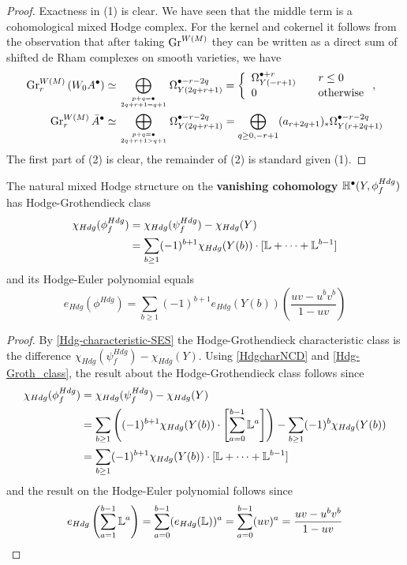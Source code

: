 \documentclass[../main.tex]{subfiles}
\begin{document}
\begin{proof} Exactness in (1) is clear. We have seen that the middle term is a cohomological mixed Hodge complex. For the kernel and cokernel it follows from the observation that after taking $\operatorname{Gr}^{W(M)}$ they can be written as a direct sum of shifted de Rham complexes on smooth varieties, we have
\begin{align*}
\operatorname{Gr}_r^{W(M)} \left(W_0 A^\bullet \right) &\simeq  \bigoplus_{{p+q=\bullet}\atop{2q+r+1=q+1}}  \Omega^{\bullet-r-2q}_{Y({2q+r+1})} = \left\{ \begin{array}{ll}
     \Omega^{\bullet+r}_{Y({-r+1})} &\quad r \leq 0 \\
     0 &\quad \text{otherwise} \\
\end{array} \right. , \\ \operatorname{Gr}_r^{W(M)} \bar A^\bullet &\simeq \bigoplus_{{p+q=\bullet}\atop{2q+r+1>q+1}}  \Omega^{\bullet-r-2q}_{Y({2q+r+1})} =  \bigoplus_{q \geq0,-r+1}(a_{r+2q+1})_* \Omega^{\bullet-r-2q}_{Y(r+2q+1)}
\end{align*}
The first part of (2) is clear, the remainder of (2) is standard given (1).
\end{proof}

\begin{cor}
The natural mixed Hodge structure on the \textbf{vanishing cohomology} $\mathbb{H}^\bullet(Y,\phi_f^{Hdg})$ has Hodge-Grothendieck class
\begin{align*} 
    \chi_{Hdg}(\phi_f^{Hdg} ) &= \chi_{Hdg}(\psi_f^{Hdg})-\chi_{Hdg}(Y) \\
    &= \sum_{b \geq 1} (-1)^{b+1} \chi_{Hdg} (Y(b)) \cdot [\mathbb{L} + \cdots + \mathbb{L}^{b-1}]
\end{align*}
and its Hodge-Euler polynomial equals
\[
e_{Hdg}(\phi^{Hdg})= \sum_{b \geq 1} (-1)^{b+1} e_{Hdg} (Y(b)) \left( \frac{uv-u^bv^b}{1-uv} \right)
\]
\end{cor}
\begin{proof}
    By \ref{Hdg-characteristic-SES} the Hodge-Grothendieck characteristic class is the difference $\chi_{Hdg}(\psi_f^{Hdg})-\chi_{Hdg}(Y)$. Using \ref{HdgcharNCD} and \eqref{Hdg-Groth_class}, the result about the Hodge-Grothendieck class follows since 
    \begin{align*}
    \chi_{Hdg}(\phi_f^{Hdg} ) &= \chi_{Hdg}(\psi_f^{Hdg}) - \chi_{Hdg}(Y)  \\
    &= \sum_{b \geq 1} \left(  (-1)^{b+1} \chi_{Hdg}(Y(b)) \cdot \left[ \sum_{a=0}^{b-1} \mathbb{L}^a \right] \right) - \sum_{b \geq 1} (-1)^b \chi_{Hdg} (Y(b))  \\
     &= \sum_{b \geq 1} (-1)^{b+1} \chi_{Hdg} (Y(b)) \cdot [\mathbb{L} + \cdots + \mathbb{L}^{b-1}]
    \end{align*}
and the result on the Hodge-Euler polynomial follows since 
\begin{align*}
    e_{Hdg} \left( \sum_{a=1}^{b-1} \mathbb{L}^a \right) = \sum_{a=0}^{b-1} (e_{Hdg}(\mathbb{L}))^a =  \sum_{a=0}^{b-1} (uv)^a = \frac{uv-u^bv^b}{1-uv}
 \end{align*}
\end{proof}
\end{document}
